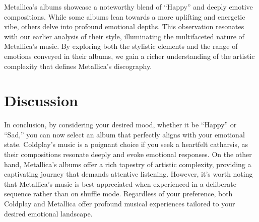 \documentclass[11pt,preprint, authoryear]{elsarticle}
\numberwithin{equation}{section}
\numberwithin{figure}{section}
\numberwithin{table}{section}
\begin{document}
Metallica's albums showcase a noteworthy blend of ``Happy'' and deeply
emotive compositions. While some albums lean towards a more uplifting
and energetic vibe, others delve into profound emotional depths. This
observation resonates with our earlier analysis of their style,
illuminating the multifaceted nature of Metallica's music. By exploring
both the stylistic elements and the range of emotions conveyed in their
albums, we gain a richer understanding of the artistic complexity that
defines Metallica's discography. \hfill

\hypertarget{discussion}{%
\section{Discussion}\label{discussion}}

In conclusion, by considering your desired mood, whether it be ``Happy''
or ``Sad,'' you can now select an album that perfectly aligns with your
emotional state. Coldplay's music is a poignant choice if you seek a
heartfelt catharsis, as their compositions resonate deeply and evoke
emotional responses. On the other hand, Metallica's albums offer a rich
tapestry of artistic complexity, providing a captivating journey that
demands attentive listening. However, it's worth noting that Metallica's
music is best appreciated when experienced in a deliberate sequence
rather than on shuffle mode. Regardless of your preference, both
Coldplay and Metallica offer profound musical experiences tailored to
your desired emotional landscape.

\newpage


\end{document}
